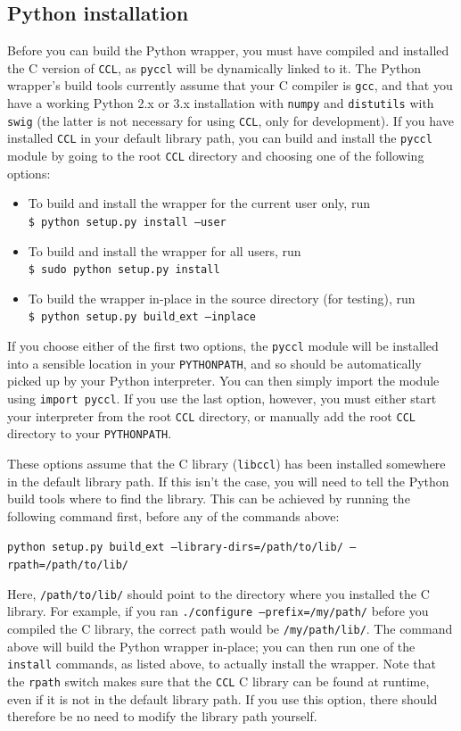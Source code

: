 \documentclass[\docopts]{\docclass}
\newcommand{\ccl}{{\tt CCL}\xspace}
\begin{document}
\subsection{Python installation}
\label{sec:python:install}

Before you can build the Python wrapper, you must have compiled and installed the C version of \ccl, as {\tt pyccl} will be dynamically linked to it. The Python wrapper's build tools currently assume that your C compiler is {\tt gcc}, and that you have a working Python 2.x or 3.x installation with {\tt numpy} and {\tt distutils} with {\tt swig} (the latter is not necessary for using \ccl, only for development). If you have installed \ccl in your default library path, you can build and install the {\tt pyccl} module by going to the root \ccl directory and choosing one of the following options:
\begin{itemize}
 \item To build and install the wrapper for the current user only, run \\
 {\tt \$ python setup.py install --user}
 \item To build and install the wrapper for all users, run \\
 {\tt \$ sudo python setup.py install}
 \item To build the wrapper in-place in the source directory (for testing), run \\
 {\tt \$ python setup.py build$\_$ext --inplace}
\end{itemize}
If you choose either of the first two options, the {\tt pyccl} module will be installed into a sensible location in your {\tt PYTHONPATH}, and so should be automatically picked up by your Python interpreter. You can then simply import the module using {\tt import pyccl}. If you use the last option, however, you must either start your interpreter from the root \ccl directory, or manually add the root \ccl directory to your {\tt PYTHONPATH}.

These options assume that the C library ({\tt libccl}) has been installed somewhere in the default library path. If this isn't the case, you will need to tell the Python build tools where to find the library. This can be achieved by running the following command first, before any of the commands above:

\texttt{python setup.py build$\_$ext --library-dirs=/path/to/lib/ --rpath=/path/to/lib/}

Here, {\tt /path/to/lib/} should point to the directory where you installed the C library. For example, if you ran {\tt ./configure --prefix=/my/path/} before you compiled the C library, the correct path would be {\tt /my/path/lib/}. The command above will build the Python wrapper in-place; you can then run one of the {\tt install} commands, as listed above, to actually install the wrapper. Note that the {\tt rpath} switch makes sure that the \ccl C library can be found at runtime, even if it is not in the default library path. If you use this option, there should therefore be no need to modify the library path yourself.
\end{document}
